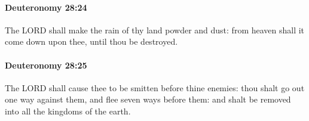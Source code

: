 		\paragraph{Deuteronomy 28:24} %
			\label{DEUTERONOMY-28-24}

			The LORD shall make the rain of thy land powder and dust: from heaven shall it come down upon thee, until thou be destroyed.


		\paragraph{Deuteronomy 28:25} %
			\label{DEUTERONOMY-28-25}

			The LORD shall cause thee to be smitten before thine enemies: thou shalt go out one way against them, and flee seven ways before them: and shalt be removed into all the kingdoms of the earth.


